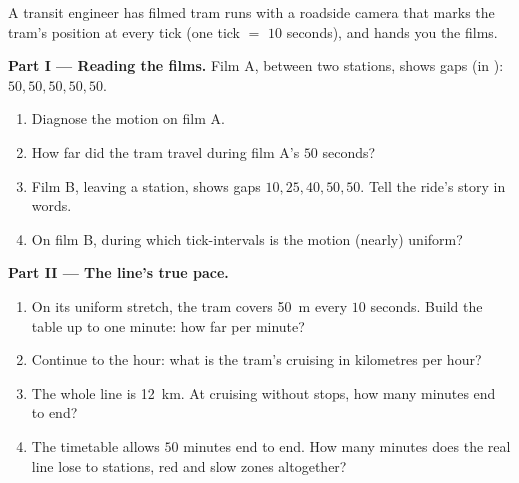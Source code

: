 \begin{problem}\label{pb:g6:describing-motion:1}
A transit engineer has filmed tram runs with a roadside camera
that marks the tram's position at every tick (one tick $=$ $10$
seconds), and hands you the films.

\medskip\noindent\textbf{Part I --- Reading the films.}
Film A, between two stations, shows gaps (in ):
$50, 50, 50, 50, 50$.
\begin{enumerate}
  \item Diagnose the motion on film A.
  \item How far did the tram travel during film A's $50$ seconds?
  \item Film B, leaving a station, shows gaps
        $10, 25, 40, 50, 50$. Tell the ride's story in words.
  \item On film B, during which tick-intervals is the motion
        (nearly) uniform?
\end{enumerate}

\medskip\noindent\textbf{Part II --- The line's true pace.}
\begin{enumerate}[resume]
  \item On its uniform stretch, the tram covers \qty{50}{m} every
        $10$ seconds. Build the table up to one minute: how far
        per minute?
  \item Continue to the hour: what is the tram's cruising 
        in kilometres per hour?
  \item The whole line is \qty{12}{km}. At cruising  without
        stops, how many minutes end to end?
  \item The timetable allows $50$ minutes end to end. How many
        minutes does the real line lose to stations, red 
        and slow zones altogether?
\end{enumerate}


\end{problem}

